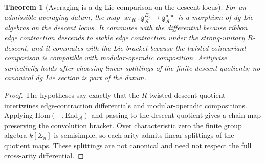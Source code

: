 \documentclass[11pt,reqno]{amsart}
\newtheorem{theorem}{Theorem}[section]
\theoremstyle{definition}
\theoremstyle{remark}
\newcommand{\cA}{\mathcal{A}}
\newcommand{\Hom}{\mathrm{Hom}}
\newcommand{\End}{\mathrm{End}}
\newcommand{\gmod}{\mathfrak{g}^{\mathrm{mod}}_{\cA}}
\newcommand{\gEone}{\mathfrak{g}^{E_{1}}_{\cA}}
\newcommand{\av}{\operatorname{av}}
\numberwithin{equation}{section}
\begin{document}
\begin{theorem}[Averaging is a dg Lie comparison on the descent locus]
\label{thm:av-dg-lie}
For an admissible averaging datum, the map
$\av_R \colon \gEone \to \gmod$ is a morphism of dg Lie algebras
on the descent locus. It commutes with the differential because
ribbon edge contraction descends to stable edge contraction under the
strong-unitary $R$-descent, and it commutes with the Lie bracket
because the twisted coinvariant comparison is compatible with
modular-operadic composition. Aritywise surjectivity holds after
choosing linear splittings of the finite descent quotients; no
canonical dg Lie section is part of the datum.
\end{theorem}

\begin{proof}
The hypotheses say exactly that the $R$-twisted descent quotient
intertwines edge-contraction differentials and modular-operadic
compositions. Applying $\Hom(-,\End_{\cA})$ and passing to the
descent quotient gives a chain map preserving the convolution
bracket. Over characteristic zero the finite group algebra
$k[\Sigma_n]$ is semisimple, so each arity admits linear splittings
of the quotient maps. These splittings are not canonical and need
not respect the full cross-arity differential.
\end{proof}
\end{document}
